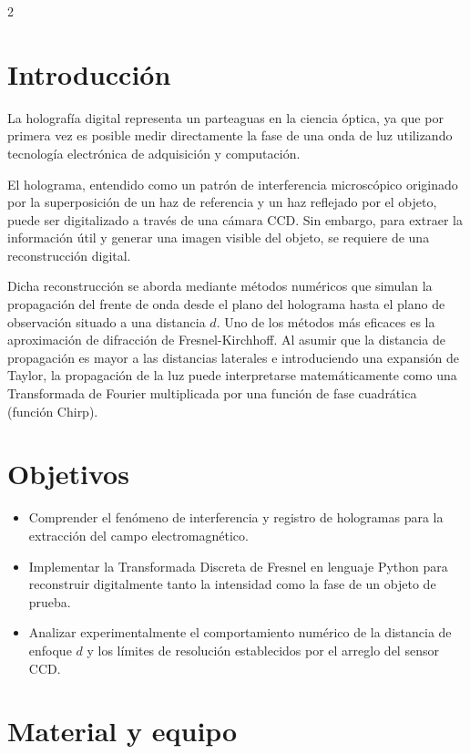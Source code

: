 \documentclass[letterpaper]{article}
\begin{document}
	\begin{multicols}{2}
		
		\section*{Introducción}
		
		La holografía digital representa un parteaguas en la ciencia óptica, ya que por primera vez es posible medir directamente la fase de una onda de luz utilizando tecnología electrónica de adquisición y computación. 
		
		El holograma, entendido como un patrón de interferencia microscópico originado por la superposición de un haz de referencia y un haz reflejado por el objeto, puede ser digitalizado a través de una cámara CCD. Sin embargo, para extraer la información útil y generar una imagen visible del objeto, se requiere de una reconstrucción digital.
		
		Dicha reconstrucción se aborda mediante métodos numéricos que simulan la propagación del frente de onda desde el plano del holograma hasta el plano de observación situado a una distancia $d$. Uno de los métodos más eficaces es la aproximación de difracción de Fresnel-Kirchhoff. Al asumir que la distancia de propagación es mayor a las distancias laterales e introduciendo una expansión de Taylor, la propagación de la luz puede interpretarse matemáticamente como una Transformada de Fourier multiplicada por una función de fase cuadrática (función Chirp).
		
		\section*{Objetivos}
		
		\begin{itemize}
			\item Comprender el fenómeno de interferencia y registro de hologramas para la extracción del campo electromagnético.
			\item Implementar la Transformada Discreta de Fresnel en lenguaje Python para reconstruir digitalmente tanto la intensidad como la fase de un objeto de prueba.
			\item Analizar experimentalmente el comportamiento numérico de la distancia de enfoque $d$ y los límites de resolución establecidos por el arreglo del sensor CCD.
		\end{itemize}
		
		\section*{Material y equipo}
		

\end{multicols}
\end{document}
